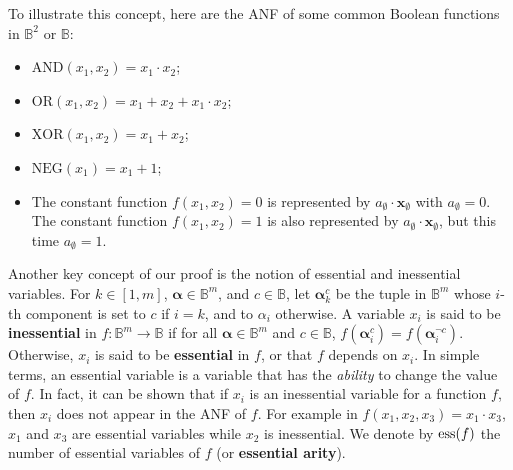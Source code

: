 \begin{testexample}
To illustrate this concept, here are
the ANF of some common Boolean functions in $\mathbb{B}^2$ or $\mathbb{B}$:

\begin{itemize}
  \item $\text{AND}(x_1, x_2) = x_1 \cdot x_2$;
  \item $\text{OR}(x_1, x_2) = x_1 + x_2 + x_1 \cdot x_2$;
  \item $\text{XOR}(x_1, x_2) = x_1 + x_2$;
  \item $\text{NEG}(x_1) = x_1 + 1$;
  \item The constant function $f(x_1, x_2) = 0$ is represented by
    $a_\emptyset\cdot \mathbf{x}_\emptyset$ with $a_\emptyset =0$. The constant
    function $f(x_1, x_2) = 1$ is also represented by $a_\emptyset\cdot
    \mathbf{x}_\emptyset$, but this time $a_\emptyset =1$.
\end{itemize}
\end{testexample}

Another key concept of our proof is the notion of essential and inessential
variables.  For $k\in [1,m]$, $\boldsymbol{\alpha}\in \mathbb{B}^m$, and $c \in
\mathbb{B}$, let ${\boldsymbol{\alpha}}_{k}^c$ be the tuple in $\mathbb{B}^{m}$
whose $i$-th component is set to $c$ if $i=k$, and to $\alpha_i$ otherwise.  A
variable $x_i$ is said to be \textbf{inessential} in $f\colon \mathbb{B}^m\to
\mathbb{B}$ if for all $\boldsymbol{\alpha} \in \mathbb{B}^m$ and $c \in
\mathbb{B}$, $f(\boldsymbol{\alpha}^c_i) = f(\boldsymbol{\alpha}^{\neg c}_i)$.
Otherwise, $x_i$ is said to be \textbf{essential} in $f$, or that $f$ depends
on $x_i$. In simple terms, an essential variable is a variable that has the
\textit{ability} to change the value of $f$. In fact, it can be shown that if
$x_i$ is an inessential variable for a function $f$, then $x_i$ does not appear
in the ANF of $f$.  For example in $f(x_1, x_2, x_3) = x_1 \cdot x_3$, $x_1$
and $x_3$ are essential variables while $x_2$ is inessential.  We denote by
$\operatorname{ess}(f)$ the number of essential variables of $f$ (or \textbf{essential
arity}).

